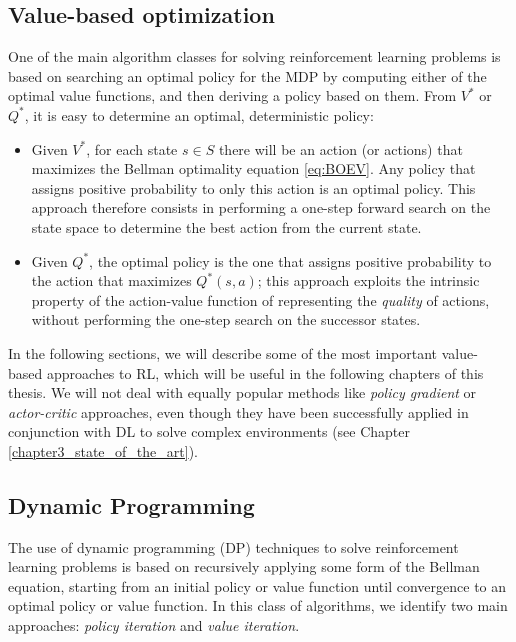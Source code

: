 \subsection{Value-based optimization} \label{s:value_based_optimization}
One of the main algorithm classes for solving reinforcement learning problems
is based on searching an optimal policy for the MDP by computing either 
of the optimal value functions, and then deriving a policy based on them.
From $V^*$ or $Q^*$, it is easy to determine an optimal, deterministic policy:
\begin{itemize}
    \item Given $V^*$, for each state $s \in S$ there will be an action (or 
    actions) that maximizes the Bellman optimality equation \eqref{eq:BOEV}. 
    Any policy that assigns positive probability to only this action is an 
    optimal policy.
    This approach therefore consists in performing a one-step forward search on 
    the state space to determine the best action from the current state.
    \item Given $Q^*$, the optimal policy is the one that assigns positive 
    probability to the action that maximizes $Q^*(s, a)$; this approach 
    exploits the intrinsic property of the action-value function of representing 
    the \textit{quality} of actions, without performing the one-step search 
    on the successor states. 
\end{itemize}

In the following sections, we will describe some of the most important 
value-based approaches to RL, which will be useful in the following chapters of 
this thesis. 
We will not deal with equally popular methods like \textit{policy gradient} or 
\textit{actor-critic} approaches, even though they have been successfully 
applied in conjunction with DL to solve complex environments (see Chapter 
\ref{chapter3_state_of_the_art}).

\subsection{Dynamic Programming}
The use of dynamic programming (DP) techniques to solve reinforcement learning 
problems is based on recursively applying some form of the Bellman equation, 
starting from an initial policy or value function until convergence to an 
optimal policy or value function.
In this class of algorithms, we identify two main approaches: \textit{policy 
iteration} and \textit{value iteration}.

